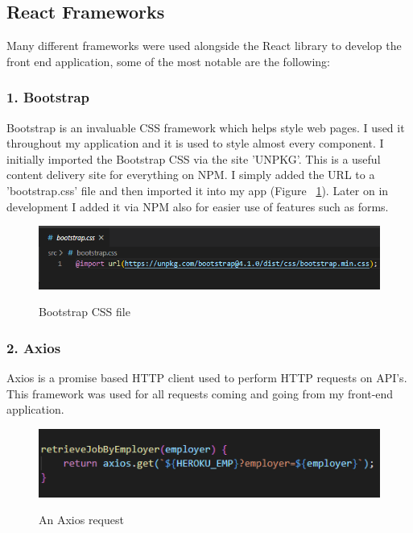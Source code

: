 \subsection{React Frameworks}
Many different frameworks were used alongside the React library to develop the front end application, some of the most notable are the following:

\subsubsection{1. Bootstrap}
Bootstrap is an invaluable CSS framework which helps style web pages. I used it throughout my application and it is used to style almost every component. I initially imported the Bootstrap CSS via the site 'UNPKG'. This is a useful content delivery site for everything on NPM. I simply added the URL to a 'bootstrap.css' file and then imported it into my app (Figure ~\ref{boot_label}). Later on in development I added it via NPM also for easier use of features such as forms.

\begin{figure}[h]
    \centering
    \includegraphics[scale=0.4]{Images/bootstrap1.png} 
    \label{boot_label}
    \caption{Bootstrap CSS file}
\end{figure}

\subsubsection{2. Axios}
Axios is a promise based HTTP client used to perform HTTP requests on API's. This framework was used for all requests coming and going from my front-end application.

\begin{figure}[h]
    \centering
    \includegraphics[scale=0.5]{Images/axios.png} 
    \label{axios_label}
    \caption{An Axios request}
\end{figure}

